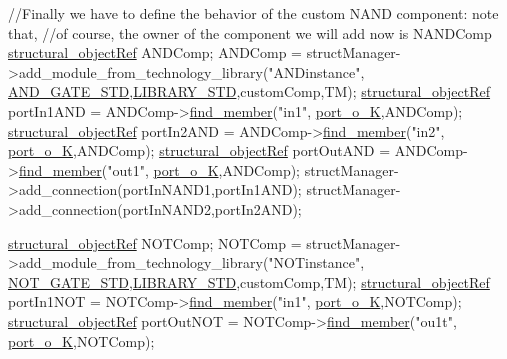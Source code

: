\begin{DoxyCode}
\textcolor{comment}{//Finally we have to define the behavior of the custom NAND component: note that,}
\textcolor{comment}{//of course, the owner of the component we will add now is NANDComp}
\hyperlink{structrefcount}{structural\_objectRef} ANDComp;
ANDComp = structManager->add\_module\_from\_technology\_library(\textcolor{stringliteral}{"ANDinstance"},
      \hyperlink{technology__node_8hpp_a92082a6ad93e10690c4c96dac3496de8}{AND\_GATE\_STD},\hyperlink{technology__manager_8hpp_a0033bdd1d1c034f88d486516cd90f614}{LIBRARY\_STD},customComp,TM);
\hyperlink{structrefcount}{structural\_objectRef} portIn1AND = ANDComp->\hyperlink{classstructural__object_a3a8b2d38c2b5666700053a72868bb6b2}{find\_member}(\textcolor{stringliteral}{"in1"},
      \hyperlink{structural__objects_8hpp_acf52399aecacb7952e414c5746ce6439acdcc7e8708a89b5424ed8b41c47f19b0}{port\_o\_K},ANDComp);
\hyperlink{structrefcount}{structural\_objectRef} portIn2AND = ANDComp->\hyperlink{classstructural__object_a3a8b2d38c2b5666700053a72868bb6b2}{find\_member}(\textcolor{stringliteral}{"in2"},
      \hyperlink{structural__objects_8hpp_acf52399aecacb7952e414c5746ce6439acdcc7e8708a89b5424ed8b41c47f19b0}{port\_o\_K},ANDComp);
\hyperlink{structrefcount}{structural\_objectRef} portOutAND = ANDComp->\hyperlink{classstructural__object_a3a8b2d38c2b5666700053a72868bb6b2}{find\_member}(\textcolor{stringliteral}{"out1"},
      \hyperlink{structural__objects_8hpp_acf52399aecacb7952e414c5746ce6439acdcc7e8708a89b5424ed8b41c47f19b0}{port\_o\_K},ANDComp);
structManager->add\_connection(portInNAND1,portIn1AND);
structManager->add\_connection(portInNAND2,portIn2AND);

\hyperlink{structrefcount}{structural\_objectRef} NOTComp;
NOTComp = structManager->add\_module\_from\_technology\_library(\textcolor{stringliteral}{"NOTinstance"},
      \hyperlink{technology__node_8hpp_a8544e5c1fc3fc2bd6b1acf5a5d64a55d}{NOT\_GATE\_STD},\hyperlink{technology__manager_8hpp_a0033bdd1d1c034f88d486516cd90f614}{LIBRARY\_STD},customComp,TM);
\hyperlink{structrefcount}{structural\_objectRef} portIn1NOT = NOTComp->\hyperlink{classstructural__object_a3a8b2d38c2b5666700053a72868bb6b2}{find\_member}(\textcolor{stringliteral}{"in1"},
      \hyperlink{structural__objects_8hpp_acf52399aecacb7952e414c5746ce6439acdcc7e8708a89b5424ed8b41c47f19b0}{port\_o\_K},NOTComp);
\hyperlink{structrefcount}{structural\_objectRef} portOutNOT = NOTComp->\hyperlink{classstructural__object_a3a8b2d38c2b5666700053a72868bb6b2}{find\_member}(\textcolor{stringliteral}{"ou1t"},
      \hyperlink{structural__objects_8hpp_acf52399aecacb7952e414c5746ce6439acdcc7e8708a89b5424ed8b41c47f19b0}{port\_o\_K},NOTComp);


\end{DoxyCode}

